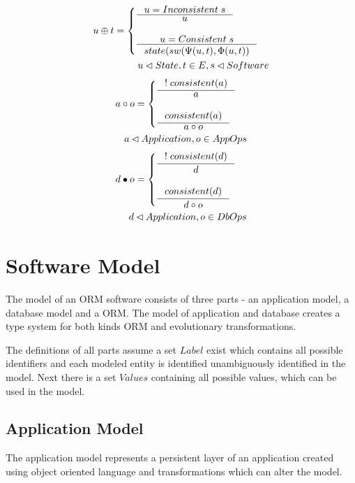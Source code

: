 \documentclass[11pt]{article}
\begin{document}
\begin{align*}
 u \oplus t = \begin{cases}
 	\inference{u = Inconsistent \; s}{u} \\ \\
 	\inference{u = Consistent \; s}{state(sw(\Psi(u, t), \Phi(u,t))} 
\end{cases}\\ 
u \lhd State, t \in E, s \lhd Software
\end{align*}
\begin{align*}
 a \circ o = \begin{cases}
 	\inference{!\;consistent(a)}{a} \\ \\
 	\inference{consistent(a)}{a \circ o} 
\end{cases}\\ 
a \lhd Application, o \in AppOps
\end{align*}
\begin{align*}
 d \bullet o = \begin{cases}
 	\inference{!\;consistent(d)}{d} \\ \\
 	\inference{consistent(d)}{d \circ o} 
\end{cases}\\ 
d \lhd Application, o \in DbOps
\end{align*}

\section{Software Model}
The model of an ORM software consists of three parts - an application model, a database model and a ORM. The model of application and database creates a type system for both kinds ORM and evolutionary transformations.

The definitions of all parts assume a set $Label$ exist which contains all possible identifiers and each modeled entity is identified unambiguously identified in the model. Next there is a set $Values$ containing all possible values, which can be used in the model. 

\subsection{Application Model}
\label{sec:appModel}
The application model represents a persistent layer of an application created using object oriented language and transformations which can alter the model. 
\end{document}
